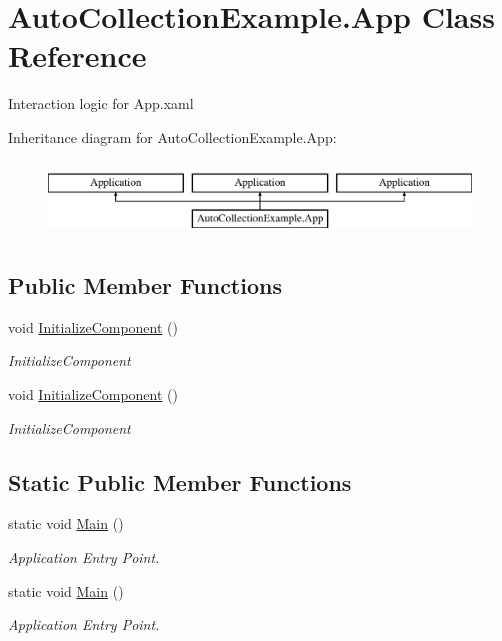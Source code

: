\hypertarget{class_auto_collection_example_1_1_app}{}\section{Auto\+Collection\+Example.\+App Class Reference}
\label{class_auto_collection_example_1_1_app}


Interaction logic for App.\+xaml  


Inheritance diagram for Auto\+Collection\+Example.\+App\+:\begin{figure}[H]
\begin{center}
\leavevmode
\includegraphics[height=2.000000cm]{d6/db2/class_auto_collection_example_1_1_app}
\end{center}
\end{figure}
\subsection*{Public Member Functions}
\begin{DoxyCompactItemize}
\item 
void \mbox{\hyperlink{class_auto_collection_example_1_1_app_a788b140a3c86ac368ec8b465eca859fa}{Initialize\+Component}} ()
\begin{DoxyCompactList}\small\item\em Initialize\+Component \end{DoxyCompactList}\item 
void \mbox{\hyperlink{class_auto_collection_example_1_1_app_a788b140a3c86ac368ec8b465eca859fa}{Initialize\+Component}} ()
\begin{DoxyCompactList}\small\item\em Initialize\+Component \end{DoxyCompactList}\end{DoxyCompactItemize}
\subsection*{Static Public Member Functions}
\begin{DoxyCompactItemize}
\item 
static void \mbox{\hyperlink{class_auto_collection_example_1_1_app_ae565896f9eb648caf5bb2ae232382442}{Main}} ()
\begin{DoxyCompactList}\small\item\em Application Entry Point. \end{DoxyCompactList}\item 
static void \mbox{\hyperlink{class_auto_collection_example_1_1_app_ae565896f9eb648caf5bb2ae232382442}{Main}} ()
\begin{DoxyCompactList}\small\item\em Application Entry Point. \end{DoxyCompactList}\end{DoxyCompactItemize}


